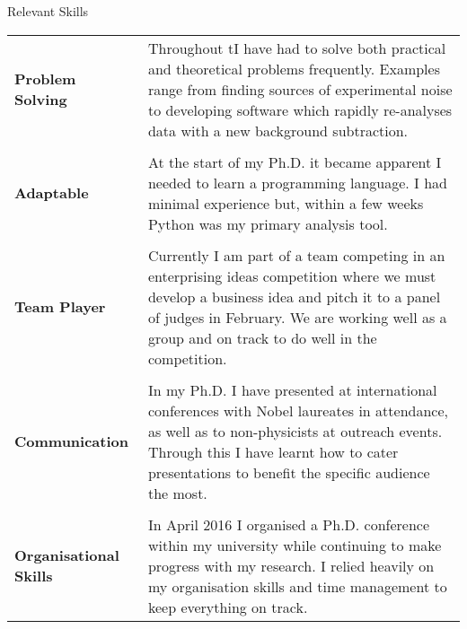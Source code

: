 \documentclass{resume} %
\begin{document}
\begin{rSection}{Relevant Skills}
\begin{tabular}{p{5cm}p{10.5cm}}
	{\bf Problem Solving}& {Throughout tI have had to solve both practical and theoretical problems frequently. Examples range from finding sources of experimental noise to developing software which rapidly re-analyses data with a new background subtraction.}\\ \\
	
	{\bf Adaptable}& {At the start of my Ph.D. it became apparent I needed to learn a programming language. I had minimal experience but, within a few weeks Python was my primary analysis tool.}\\ \\
	
	{\bf Team Player}& {Currently I am part of a team competing in an enterprising ideas competition where we must develop a business idea and pitch it to a panel of judges in February. We are working well as a group and on track to do well in the competition.}\\ \\
	
	{\bf Communication}& {In my Ph.D. I have presented at international conferences with Nobel laureates in attendance, as well as to non-physicists at outreach events. Through this I have learnt how to cater presentations to benefit the specific audience the most.}\\ \\
	
	{\bf Organisational Skills}& {In April 2016 I organised a Ph.D. conference within my university while continuing to make progress with my research. I relied heavily on my organisation skills and time management to keep everything on track.}
\end{tabular}


\end{rSection}
\end{document}
